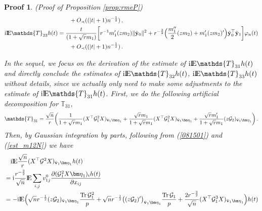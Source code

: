 \documentclass[12pt]{article}
\numberwithin{equation}{section}
\newtheorem{myPro}{Proof}
\theoremstyle{remark}
\newcommand{\1}{{\rm 1}\kern-0.24em{\rm I}}
\newcommand{\E}{{\rm I}\kern-0.18em{\rm E}}
\begin{document}
\begin{appendices}
\begin{myPro}{(Proof of Proposition  \ref{prop:rmeP})}
\begin{align}
 &\qquad + O_\prec((|t|+1)n^{-\frac 12})\,,\label{est:ET22P}\\
\mathrm{i} \E\mathds{T}_{23}h(t)&= \frac{t}{(1+\sqrt r m_1)}\bigg[ r^{-1}{m_1'} (zm_2) \Vert\tilde{\bf y}_{0}\Vert^2 +r^{-\frac 32} \Big( \frac{m_1''}{2} (zm_2) + {m_1'} (zm_2)' \Big) \tilde{\bf y}_0^{\top}\tilde{\bf y}_{1}\bigg]\varphi_n(t)\notag\\
   &\qquad + O_\prec((|t|+1)n^{-\frac 12})\,. \label{est:ET23P}
\end{align}


 In the sequel, we focus on the derivation of the  estimate of $ \mathrm{i}\E\mathds{T}_{31}h(t)$ and directly conclude the estimates of  $ \mathrm{i}\E\mathds{T}_{32}h(t)$, $ \mathrm{i}\E\mathds{T}_{33}h(t)$ without details, since we actually only need to make some adjustments to the  estimate of $ \mathrm{i}\E\mathds{T}_{31}h(t)$.
 First, we do the following artificial decomposition for $\mathds{T}_{31}$,
 \begin{align*}
\mathds{T}_{31}= \frac{\sqrt n}{ r}\bigg( \frac{1}{1+\sqrt r m_1}({X}^\top \mathcal{G}_1^2{X})_{\bar{\bf v}_1{\bm \eta}_1} + \frac{\sqrt r m_1}{1+\sqrt r m_1}  ({X}^\top \mathcal{G}_1^2{X})_{\bar{\bf v}_1{\bm \eta}_1} 
+ \frac{\sqrt r m_1'}{1+\sqrt r m_1}  (z \mathcal{G}_2)_{\bar{\bf v}_1{\bm \eta}_1} \bigg)\,. 
 \end{align*}
 Then, by Gaussian integration by parts,  following from  (\ref{081501}) and (\ref{est_m12N}) we have
 \begin{align*}
&\quad \mathrm{i} \E\frac{\sqrt n}{ r} ({X}^{\top} \mathcal{G}^2{X})_{\bar{\bf v}_1{\bm \eta}_1}h(t)
 \notag\\
& =  \mathrm{i}\frac{r^{-\frac 32}}{\sqrt n} \E\sum_{i,j} v_{1j}^0  \frac{\partial (\mathcal{G}_1^2{X}{\bm \eta}_1)_ih(t) }{\partial x_{ij}}\notag\\
&= - \mathrm{i} \E \Big( \sqrt n r^{-\frac 12} (z\mathcal{G}_2)_{\bar{\bf v}_1 {\bm \eta}_1} \frac{{\rm Tr}\, \mathcal{G}_1^2}{p} + \sqrt n r^{-\frac 12}  \big((z\mathcal{G}_2)'\big)_{\bar{\bf v}_1 {\bm \eta}_1} \frac{{\rm Tr}\, \mathcal{G}_1}{p} +\frac{2 r^{-\frac 32}}{\sqrt n} ({X}^{\top} \mathcal{G}_1^3{X})_{\bar{\bf v}_1 {\bm \eta}_1}   \Big)h(t)\notag\\

\end{align*}
\end{myPro}
\end{appendices}
\end{document}
